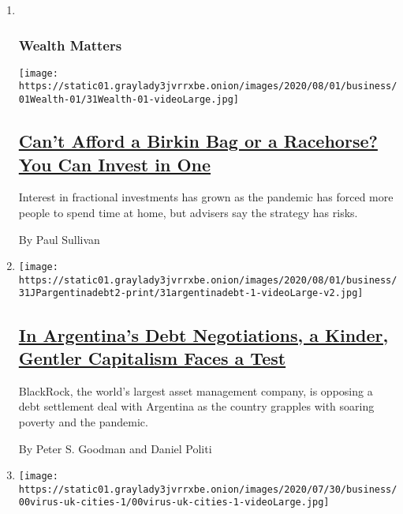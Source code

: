 \begin{enumerate}
\def\labelenumi{\arabic{enumi}.}
\item ~
  \hypertarget{wealth-matters}{%
  \subsubsection{Wealth Matters}\label{wealth-matters}}

  \texttt{[image: https://static01.graylady3jvrrxbe.onion/images/2020/08/01/business/01Wealth-01/31Wealth-01-videoLarge.jpg]}

  \hypertarget{cant-afford-a-birkin-bag-or-a-racehorse-you-can-invest-in-one}{%
  \subsection{\texorpdfstring{\href{/2020/07/31/your-money/birkin-bag-racehorse-invest.html}{Can't
  Afford a Birkin Bag or a Racehorse? You Can Invest in
  One}}{Can't Afford a Birkin Bag or a Racehorse? You Can Invest in One}}\label{cant-afford-a-birkin-bag-or-a-racehorse-you-can-invest-in-one}}

  Interest in fractional investments has grown as the pandemic has
  forced more people to spend time at home, but advisers say the
  strategy has risks.

  By Paul Sullivan
\item
  \texttt{[image: https://static01.graylady3jvrrxbe.onion/images/2020/08/01/business/31JPargentinadebt2-print/31argentinadebt-1-videoLarge-v2.jpg]}

  \hypertarget{in-argentinas-debt-negotiations-a-kinder-gentler-capitalism-faces-a-test}{%
  \subsection{\texorpdfstring{\href{/2020/07/31/business/argentina-debt.html}{In
  Argentina's Debt Negotiations, a Kinder, Gentler Capitalism Faces a
  Test}}{In Argentina's Debt Negotiations, a Kinder, Gentler Capitalism Faces a Test}}\label{in-argentinas-debt-negotiations-a-kinder-gentler-capitalism-faces-a-test}}

  BlackRock, the world's largest asset management company, is opposing a
  debt settlement deal with Argentina as the country grapples with
  soaring poverty and the pandemic.

  By Peter S. Goodman and Daniel Politi
\item
  \texttt{[image: https://static01.graylady3jvrrxbe.onion/images/2020/07/30/business/00virus-uk-cities-1/00virus-uk-cities-1-videoLarge.jpg]}


\end{enumerate}
